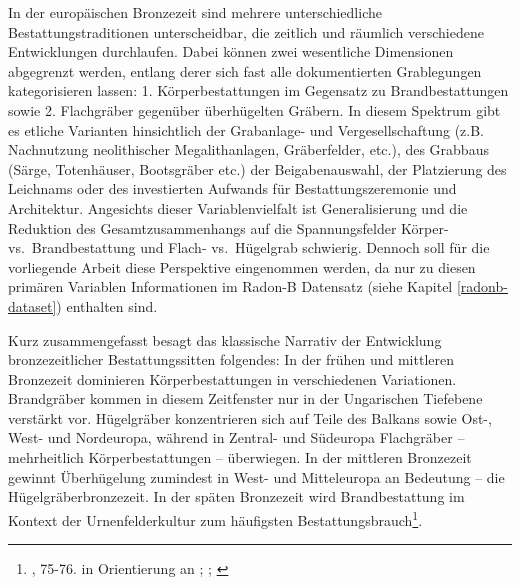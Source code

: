 \documentclass[openany,twoside,twocolumn]{book}
\let\rmarkdownfootnote\footnote%
\def\footnote{\protect\rmarkdownfootnote}
\begin{document}
In der europäischen Bronzezeit sind mehrere unterschiedliche
Bestattungstraditionen unterscheidbar, die zeitlich und räumlich
verschiedene Entwicklungen durchlaufen. Dabei können zwei wesentliche
Dimensionen abgegrenzt werden, entlang derer sich fast alle
dokumentierten Grablegungen kategorisieren lassen: 1. Körperbestattungen
im Gegensatz zu Brandbestattungen sowie 2. Flachgräber gegenüber
überhügelten Gräbern. In diesem Spektrum gibt es etliche Varianten
hinsichtlich der Grabanlage- und Vergesellschaftung (z.B. Nachnutzung
neolithischer Megalithanlagen, Gräberfelder, etc.), des Grabbaus (Särge,
Totenhäuser, Bootsgräber etc.) der Beigabenauswahl, der Platzierung des
Leichnams oder des investierten Aufwands für Bestattungszeremonie und
Architektur. Angesichts dieser Variablenvielfalt ist Generalisierung und
die Reduktion des Gesamtzusammenhangs auf die Spannungsfelder Körper-
vs.~Brandbestattung und Flach- vs.~Hügelgrab schwierig. Dennoch soll für
die vorliegende Arbeit diese Perspektive eingenommen werden, da nur zu
diesen primären Variablen Informationen im Radon-B Datensatz (siehe
Kapitel \ref{radonb-dataset}) enthalten sind.

Kurz zusammengefasst besagt das klassische Narrativ der Entwicklung
bronzezeitlicher Bestattungssitten folgendes: In der frühen und
mittleren Bronzezeit dominieren Körperbestattungen in verschiedenen
Variationen. Brandgräber kommen in diesem Zeitfenster nur in der
Ungarischen Tiefebene verstärkt vor. Hügelgräber konzentrieren sich auf
Teile des Balkans sowie Ost-, West- und Nordeuropa, während in Zentral-
und Südeuropa Flachgräber -- mehrheitlich Körperbestattungen --
überwiegen. In der mittleren Bronzezeit gewinnt Überhügelung zumindest
in West- und Mitteleuropa an Bedeutung -- die Hügelgräberbronzezeit. In
der späten Bronzezeit wird Brandbestattung im Kontext der
Urnenfelderkultur zum häufigsten Bestattungsbrauch\footnote{\textcite{harding_european_2000},
  75-76. in Orientierung an \textcite{hausler_bestattungssitten_1977};
  \textcite{hausler_grab-_1994};
  \textcite{hausler_totenorientierung_1996}}.
\end{document}
